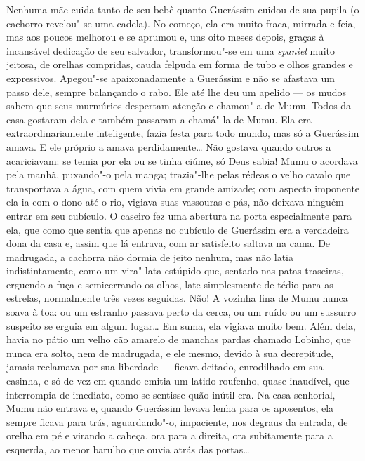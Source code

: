 Nenhuma mãe cuida tanto de seu bebê quanto Guerássim cuidou de sua
pupila (o cachorro revelou"-se uma cadela). No começo, ela era muito
fraca, mirrada e feia, mas aos poucos melhorou e se aprumou e, uns oito
meses depois, graças à incansável dedicação de seu salvador,
transformou"-se em uma \emph{spaniel} muito jeitosa, de orelhas
compridas, cauda felpuda em forma de tubo e olhos grandes e expressivos.
Apegou"-se apaixonadamente a Guerássim e não se afastava um passo dele,
sempre balançando o rabo. Ele até lhe deu um apelido --- os mudos sabem
que seus murmúrios despertam atenção e chamou"-a de Mumu. Todos da casa
gostaram dela e também passaram a chamá"-la de Mumu. Ela era
extraordinariamente inteligente, fazia festa para todo mundo, mas só a
Guerássim amava. E ele próprio a amava perdidamente\ldots{} Não gostava
quando outros a acariciavam: se temia por ela ou se tinha ciúme, só Deus
sabia! Mumu o acordava pela manhã, puxando"-o pela manga; trazia"-lhe
pelas rédeas o velho cavalo que transportava a água, com quem vivia em
grande amizade; com aspecto imponente ela ia com o dono até o rio,
vigiava suas vassouras e pás, não deixava ninguém entrar em seu
cubículo. O caseiro fez uma abertura na porta especialmente para ela,
que como que sentia que apenas no cubículo de Guerássim era a verdadeira
dona da casa e, assim que lá entrava, com ar satisfeito saltava na cama.
De madrugada, a cachorra não dormia de jeito nenhum, mas não latia
indistintamente, como um vira"-lata estúpido que, sentado nas patas
traseiras, erguendo a fuça e semicerrando os olhos, late simplesmente de
tédio para as estrelas, normalmente três vezes seguidas. Não! A vozinha
fina de Mumu nunca soava à toa: ou um estranho passava perto da cerca,
ou um ruído ou um sussurro suspeito se erguia em algum lugar\ldots{} Em suma,
ela vigiava muito bem. Além dela, havia no pátio um velho cão amarelo de
manchas pardas chamado Lobinho, que nunca era solto, nem de madrugada, e
ele mesmo, devido à sua decrepitude, jamais reclamava por sua liberdade
--- ficava deitado, enrodilhado em sua casinha, e só de vez em quando
emitia um latido roufenho, quase inaudível, que interrompia de imediato,
como se sentisse quão inútil era. Na casa senhorial, Mumu não entrava e,
quando Guerássim levava lenha para os aposentos, ela sempre ficava para
trás, aguardando"-o, impaciente, nos degraus da entrada, de orelha em pé
e virando a cabeça, ora para a direita, ora subitamente para a esquerda,
ao menor barulho que ouvia atrás das portas\ldots{}

